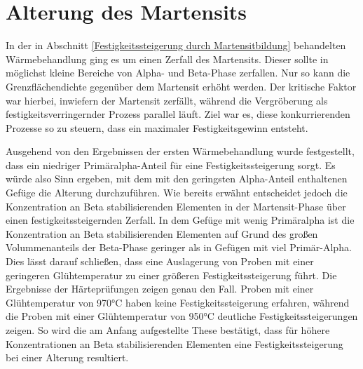 \documentclass[a4paper, 11pt]{tubsreprt}
\begin{document}
\section{Alterung des Martensits}
In der in Abschnitt \ref{Festigkeitssteigerung durch Martensitbildung} behandelten Wärmebehandlung ging es um einen Zerfall des Martensits. Dieser sollte in möglichst kleine Bereiche von Alpha- und Beta-Phase zerfallen. Nur so kann die Grenzflächendichte gegenüber dem Martensit erhöht werden. Der kritische Faktor war hierbei, inwiefern der Martensit zerfällt, während die Vergröberung als festigkeitsverringernder Prozess parallel läuft. Ziel war es, diese konkurrierenden Prozesse so zu steuern, dass ein maximaler Festigkeitsgewinn entsteht. 

Ausgehend von den Ergebnissen der ersten Wärmebehandlung wurde festgestellt, dass ein niedriger Primäralpha-Anteil für eine Festigkeitssteigerung sorgt. Es würde also Sinn ergeben, mit dem mit den geringsten Alpha-Anteil enthaltenen Gefüge die Alterung durchzuführen. Wie bereits erwähnt entscheidet jedoch die Konzentration an Beta stabilisierenden Elementen in der Martensit-Phase über einen festigkeitssteigernden Zerfall. In dem Gefüge mit wenig Primäralpha ist die Konzentration an Beta stabilisierenden Elementen auf Grund des großen Volummenanteils der Beta-Phase geringer als in Gefügen mit viel Primär-Alpha. Dies lässt darauf schließen, dass eine Auslagerung von Proben mit einer geringeren Glühtemperatur zu einer größeren Festigkeitssteigerung führt. Die Ergebnisse der Härteprüfungen zeigen genau den Fall. Proben mit einer Glühtemperatur von 970°C haben keine Festigkeitssteigerung erfahren, während die Proben mit einer Glühtemperatur von 950°C deutliche Festigkeitssteigerungen zeigen. So wird die am Anfang aufgestellte These bestätigt, dass für höhere Konzentrationen an Beta stabilisierenden Elementen eine Festigkeitssteigerung bei einer Alterung resultiert. 
\end{document}
